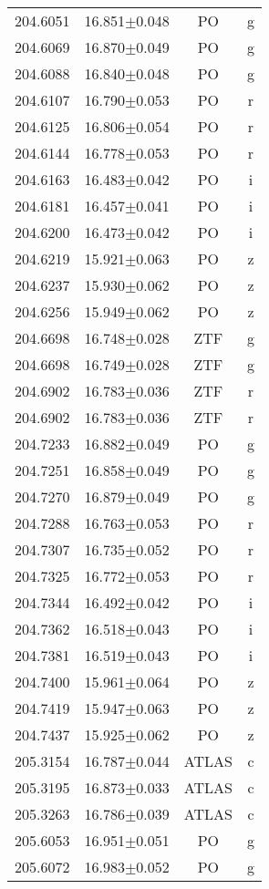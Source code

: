 \begin{table}
\begin{tabular}{cccc}
204.6051 & 16.851$\pm$0.048 & PO & g \\
204.6069 & 16.870$\pm$0.049 & PO & g \\
204.6088 & 16.840$\pm$0.048 & PO & g \\
204.6107 & 16.790$\pm$0.053 & PO & r \\
204.6125 & 16.806$\pm$0.054 & PO & r \\
204.6144 & 16.778$\pm$0.053 & PO & r \\
204.6163 & 16.483$\pm$0.042 & PO & i \\
204.6181 & 16.457$\pm$0.041 & PO & i \\
204.6200 & 16.473$\pm$0.042 & PO & i \\
204.6219 & 15.921$\pm$0.063 & PO & z \\
204.6237 & 15.930$\pm$0.062 & PO & z \\
204.6256 & 15.949$\pm$0.062 & PO & z \\
204.6698 & 16.748$\pm$0.028 & ZTF & g \\
204.6698 & 16.749$\pm$0.028 & ZTF & g \\
204.6902 & 16.783$\pm$0.036 & ZTF & r \\
204.6902 & 16.783$\pm$0.036 & ZTF & r \\
204.7233 & 16.882$\pm$0.049 & PO & g \\
204.7251 & 16.858$\pm$0.049 & PO & g \\
204.7270 & 16.879$\pm$0.049 & PO & g \\
204.7288 & 16.763$\pm$0.053 & PO & r \\
204.7307 & 16.735$\pm$0.052 & PO & r \\
204.7325 & 16.772$\pm$0.053 & PO & r \\
204.7344 & 16.492$\pm$0.042 & PO & i \\
204.7362 & 16.518$\pm$0.043 & PO & i \\
204.7381 & 16.519$\pm$0.043 & PO & i \\
204.7400 & 15.961$\pm$0.064 & PO & z \\
204.7419 & 15.947$\pm$0.063 & PO & z \\
204.7437 & 15.925$\pm$0.062 & PO & z \\
205.3154 & 16.787$\pm$0.044 & ATLAS & c \\
205.3195 & 16.873$\pm$0.033 & ATLAS & c \\
205.3263 & 16.786$\pm$0.039 & ATLAS & c \\
205.6053 & 16.951$\pm$0.051 & PO & g \\
205.6072 & 16.983$\pm$0.052 & PO & g \\

\end{tabular}
\end{table}

